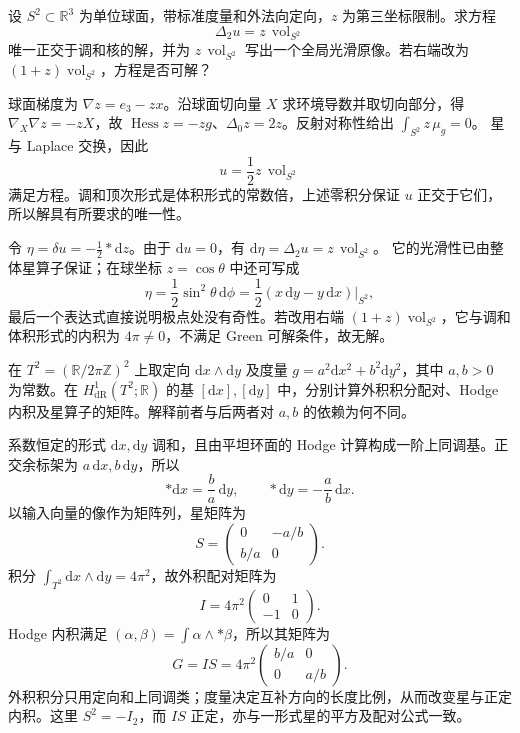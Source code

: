 \begin{exercise}\label{g3:ex:sphere-top-form-primitive}
	设 \(S^2\subset\mathbb R^3\) 为单位球面，带标准度量和外法向定向，\(z\) 为第三坐标限制。求方程
	\[
		\Delta_2 u=z\,\operatorname{vol}_{S^2}
	\]
	唯一正交于调和核的解，并为 \(z\,\operatorname{vol}_{S^2}\) 写出一个全局光滑原像。若右端改为 \((1+z)\operatorname{vol}_{S^2}\)，方程是否可解？
\end{exercise}
\begin{solution}
	球面梯度为 \(\nabla z=e_3-zx\)。沿球面切向量 \(X\) 求环境导数并取切向部分，得
	\(\nabla_X\nabla z=-zX\)，故 \(\operatorname{Hess}z=-zg\)、\(\Delta_0z=2z\)。反射对称性给出 \(\int_{S^2}z\,\mu_g=0\)。
	星与 Laplace 交换，因此
	\[
		u=\frac12z\,\operatorname{vol}_{S^2}
	\]
	满足方程。调和顶次形式是体积形式的常数倍，上述零积分保证 \(u\) 正交于它们，所以解具有所要求的唯一性。

	令 \(\eta=\delta u=-\tfrac12*\mathrm dz\)。由于 \(\mathrm du=0\)，有
	\(\mathrm d\eta=\Delta_2u=z\,\operatorname{vol}_{S^2}\)。
	它的光滑性已由整体星算子保证；在球坐标 \(z=\cos\theta\) 中还可写成
	\[
		\eta=\frac12\sin^2\theta\,\mathrm d\phi
		=\frac12(x\,\mathrm dy-y\,\mathrm dx)\big|_{S^2},
	\]
	最后一个表达式直接说明极点处没有奇性。若改用右端 \((1+z)\operatorname{vol}_{S^2}\)，它与调和体积形式的内积为 \(4\pi\ne0\)，不满足 Green 可解条件，故无解。
\end{solution}

\begin{exercise}\label{g3:ex:torus-two-pairings}
	在 \(T^2=(\mathbb R/2\pi\mathbb Z)^2\) 上取定向 \(\mathrm dx\wedge\mathrm dy\) 及度量
	\(g=a^2\mathrm dx^2+b^2\mathrm dy^2\)，其中 \(a,b>0\) 为常数。在 \(H_{\mathrm{dR}}^1(T^2;\mathbb R)\) 的基 \([\mathrm dx],[\mathrm dy]\) 中，分别计算外积积分配对、Hodge 内积及星算子的矩阵。解释前者与后两者对 \(a,b\) 的依赖为何不同。
\end{exercise}
\begin{solution}
	系数恒定的形式 \(\mathrm dx,\mathrm dy\) 调和，且由平坦环面的 Hodge 计算构成一阶上同调基。正交余标架为 \(a\,\mathrm dx,b\,\mathrm dy\)，所以
	\[
		*\mathrm dx=\frac ba\,\mathrm dy,\qquad
		*\mathrm dy=-\frac ab\,\mathrm dx.
	\]
	以输入向量的像作为矩阵列，星矩阵为
	\[
		S=\begin{pmatrix}0&-a/b\\ b/a&0\end{pmatrix}.
	\]
	积分 \(\int_{T^2}\mathrm dx\wedge\mathrm dy=4\pi^2\)，故外积配对矩阵为
	\[
		I=4\pi^2\begin{pmatrix}0&1\\-1&0\end{pmatrix}.
	\]
	Hodge 内积满足 \((\alpha,\beta)=\int\alpha\wedge *\beta\)，所以其矩阵为
	\[
		G=IS=4\pi^2\begin{pmatrix}b/a&0\\0&a/b\end{pmatrix}.
	\]
	外积积分只用定向和上同调类；度量决定互补方向的长度比例，从而改变星与正定内积。这里 \(S^2=-I_2\)，而 \(IS\) 正定，亦与一形式星的平方及配对公式一致。
\end{solution}

